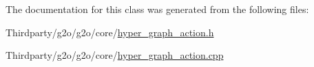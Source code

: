 The documentation for this class was generated from the following files\+:\begin{DoxyCompactItemize}
\item 
Thirdparty/g2o/g2o/core/\mbox{\hyperlink{hyper__graph__action_8h}{hyper\+\_\+graph\+\_\+action.\+h}}\item 
Thirdparty/g2o/g2o/core/\mbox{\hyperlink{hyper__graph__action_8cpp}{hyper\+\_\+graph\+\_\+action.\+cpp}}\end{DoxyCompactItemize}
